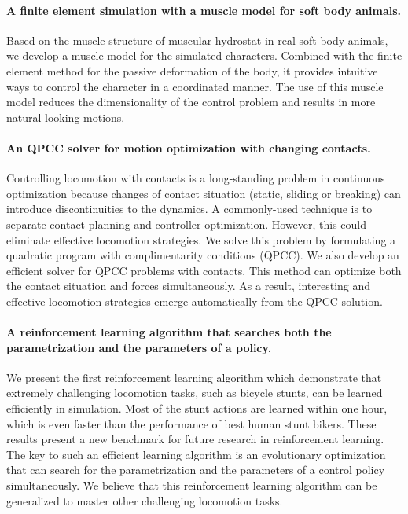 \paragraph{A finite element simulation with a muscle model for soft body animals.} Based on the muscle structure of muscular hydrostat \cite{} in real soft body animals, we develop a muscle model for the simulated characters. Combined with the finite element method for the passive deformation of the body, it provides intuitive ways to control the character in a coordinated manner. The use of this muscle model reduces the dimensionality of the control problem and results in more natural-looking motions.

\paragraph{An QPCC solver for motion optimization with changing contacts.} Controlling locomotion with contacts is a long-standing problem in continuous optimization because changes of contact situation (static, sliding or breaking) can introduce discontinuities to the dynamics. A commonly-used technique is to separate contact planning and controller optimization. However, this could eliminate effective locomotion strategies. We solve this problem by formulating a quadratic program with complimentarity conditions (QPCC). We also develop an efficient solver for QPCC problems with contacts. This method can optimize both the contact situation and forces simultaneously. As a result, interesting and effective locomotion strategies emerge automatically from the QPCC solution.

\paragraph{A reinforcement learning algorithm that searches both the parametrization and the parameters of a policy.} We present the first reinforcement learning algorithm which demonstrate that extremely challenging locomotion tasks, such as bicycle stunts, can be learned efficiently in simulation. Most of the stunt actions are learned within one hour, which is even faster than the performance of best human stunt bikers. These results present a new benchmark for future research in reinforcement learning. The key to such an efficient learning algorithm is an evolutionary optimization that can search for the parametrization and the parameters of a control policy simultaneously. We believe that this reinforcement learning algorithm can be generalized to master other challenging locomotion tasks.

